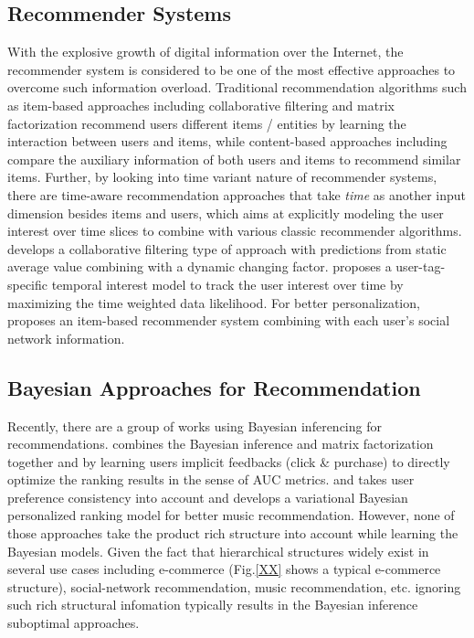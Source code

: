 \subsection{Recommender Systems}

With the explosive growth of digital information over the Internet, the recommender system is considered to be one of the most effective approaches to overcome such information overload. Traditional recommendation algorithms such as item-based approaches including collaborative filtering \cite{Sarwar:2001:ICF:371920.372071,Su:2009:SCF:1592474.1722966} and matrix factorization \cite{Rendle:2010:FPM} recommend users different items / entities by learning the interaction between users and items, while content-based approaches including \cite{2011rsh..book...73L,Liu:2011,Yuan:2015} compare the auxiliary information of both users and items to recommend similar items.  Further, by looking into time variant nature of recommender systems, there are time-aware recommendation approaches \cite{Gultekin_acollaborative,Tang_review:2013} that take \emph{time} as another input dimension besides items and users, which aims at explicitly modeling the user interest over time slices to combine with various classic recommender algorithms. \cite{Koren:2010} develops a collaborative filtering type of approach with predictions from static average value combining with a dynamic changing factor.  \cite{Yin:2011} proposes a user-tag-specific temporal interest model to track the user interest over time by maximizing the time weighted data likelihood.  For better personalization, \cite{Guy:2009} proposes an item-based recommender system combining with each user's social network information. 
\subsection{Bayesian Approaches for Recommendation}

Recently, there are a group of works using Bayesian inferencing for recommendations. \cite{rendle2009bpr} combines the Bayesian inference and matrix factorization together and by learning users implicit feedbacks (click \& purchase) to directly optimize the ranking results in the sense of AUC metrics. \cite{Ben-Elazar:2017} and \cite{zhang2007efficient} takes user preference consistency into account and develops a variational Bayesian personalized ranking model for better music recommendation.  However, none of those approaches take the product rich structure into account while learning the Bayesian models.  Given the fact that hierarchical structures widely exist in several use cases including e-commerce (Fig.\ref{XX} shows a typical e-commerce structure), social-network recommendation, music recommendation, etc. ignoring such rich structural infomation typically results in the Bayesian inference suboptimal approaches.  

